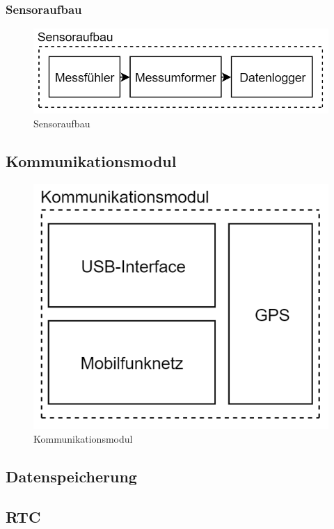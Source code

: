 \subsubsection*{Sensoraufbau}
\begin{figure}[h]
\centering
\includegraphics[scale=0.7]{graphics/Sensoraufbau.PNG}
\caption{Sensoraufbau}
\end{figure}

\newpage
\subsection{Kommunikationsmodul}
\begin{figure}[h]
\centering
\includegraphics[scale=0.7]{graphics/Kommunikationsmodul.PNG}
\caption{Kommunikationsmodul}
\end{figure}

\newpage
\subsection{Datenspeicherung}

\newpage
\subsection{RTC}

